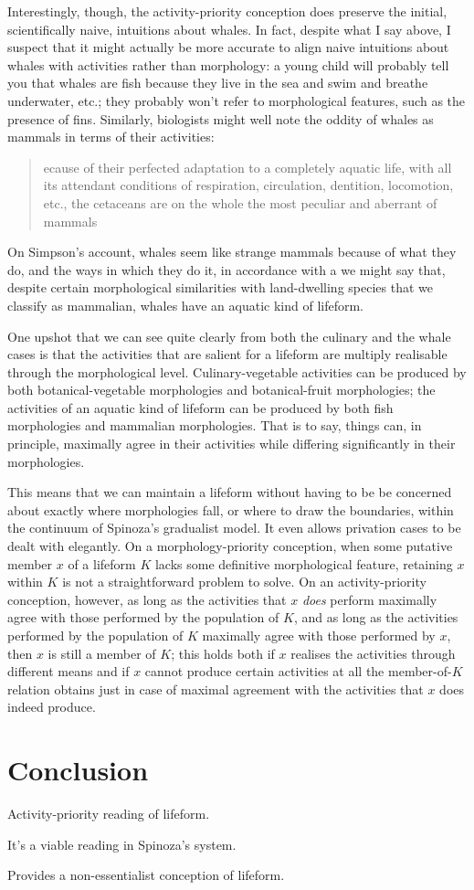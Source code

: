 \documentclass{article}
\newcommand{\dash}{\unskip{—}}
\begin{document}
Interestingly, though, the activity-priority conception does preserve the initial, scientifically naive, intuitions about whales. In fact, despite what I say above, I suspect that it might actually be more accurate to align naive intuitions about whales with activities rather than morphology: a young child will probably tell you that whales are fish because they live in the sea and swim and breathe underwater, etc.; they probably won't refer to morphological features, such as the presence of fins. Similarly, biologists might well note the oddity of whales as mammals in terms of their activities:
{
  \blockcquote[213]{Simpson:1945}[.]{ecause of their perfected adaptation to a completely aquatic life, with all its attendant conditions of respiration, circulation, dentition, locomotion, etc., the cetaceans are on the whole the most peculiar and aberrant of mammals}
}
On Simpson's account, whales seem like strange mammals because of what they do, and the ways in which they do it, in accordance with a  \dash we might say that, despite certain morphological similarities with land-dwelling species that we classify as mammalian, whales have an aquatic kind of lifeform.

One upshot that we can see quite clearly from both the culinary and the whale cases is that the activities that are salient for a lifeform are multiply realisable through the morphological level. Culinary-vegetable activities can be produced by both botanical-vegetable morphologies and botanical-fruit morphologies; the activities of an aquatic kind of lifeform can be produced by both fish morphologies and mammalian morphologies. That is to say, things can, in principle, maximally agree in their activities while differing significantly in their morphologies.

This means that we can maintain a lifeform without having to be be concerned about exactly where morphologies fall, or where to draw the boundaries, within the continuum of Spinoza's gradualist model. It even allows privation cases to be dealt with elegantly. On a morphology-priority conception, when some putative member $x$ of a lifeform $K$ lacks some definitive morphological feature, retaining $x$ within $K$ is not a straightforward problem to solve. On an activity-priority conception, however, as long as the activities that $x$ \emph{does} perform maximally agree with those performed by the population of $K$, and as long as the activities performed by the population of $K$ maximally agree with those performed by $x$, then $x$ is still a member of $K$; this holds both if $x$ realises the activities through different means and if $x$ cannot produce certain activities at all \dash the member-of-$K$ relation obtains just in case of maximal agreement with the activities that $x$ does indeed produce.

\section{Conclusion}\label{sec:Conclusion}
Activity-priority reading of lifeform.

It's a viable reading in Spinoza's system.

Provides a non-essentialist conception of lifeform.

\printbibliography
\end{document}
